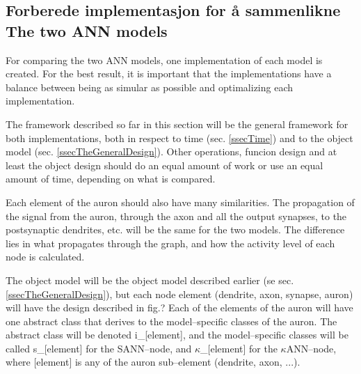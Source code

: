 	


	\subsection{Forberede implementasjon for å sammenlikne The two ANN models}

	For comparing the two ANN models, one implementation of each model is created. 
	For the best result, it is important that the implementations have a balance between being as simular as possible and optimalizing each implementation.

	The framework described so far in this section will be the general framework for both implementations, both in respect to time (sec. \ref{ssecTime}) and to the object model (sec. \ref{ssecTheGeneralDesign}).
	Other operations, funcion design and at least the object design should do an equal amount of work or use an equal amount of time, depending on what is compared. %

	Each element of the auron should also have many similarities. The propagation of the signal from the auron, through the axon and all the output synapses, to the postsynaptic dendrites, etc. will be the same for the two models.
	The difference lies in what propagates through the graph, and how the activity level of each node is calculated. 
	
	The object model will be the object model described earlier (se sec. \ref{ssecTheGeneralDesign}), but each node element (dendrite, axon, synapse, auron) will have the design %
		described in fig.? %
	Each of the elements of the auron will have one abstract class that derives to the model--specific classes of the auron. 
	The abstract class will be denoted i\_[element], and the model--specific classes will be called s\_[element] for the SANN--node, and $\kappa$\_[element] for the $\kappa$ANN--node, 
		where [element] is any of the auron sub--element (dendrite, axon, ...).

